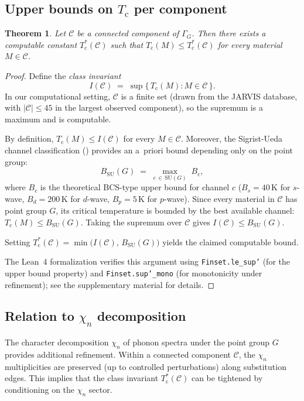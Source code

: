 \documentclass[12pt,a4paper]{article}
\theoremstyle{plain}
\newtheorem{theorem}{Theorem}[section]
\theoremstyle{definition}
\theoremstyle{remark}
\newcommand{\Tc}{T_{\mathrm{c}}}
\newcommand{\chin}{\chi_n}
\begin{document}
\subsection{Upper bounds on $\Tc$ per component}

\begin{theorem}\label{thm:upper-bound}
Let $\mathcal{C}$ be a connected component of $\Gamma_G$.  Then there
exists a computable constant $\Tc^*(\mathcal{C})$ such that
$\Tc(M) \leq \Tc^*(\mathcal{C})$ for every material $M \in \mathcal{C}$.
\end{theorem}

\begin{proof}
Define the \emph{class invariant}
\[
  I(\mathcal{C}) \;=\; \sup\bigl\{\,\Tc(M) : M \in \mathcal{C}\,\bigr\}.
\]
In our computational setting, $\mathcal{C}$ is a finite set (drawn from the
JARVIS database, with $|\mathcal{C}| \leq 45$ in the largest observed
component), so the supremum is a maximum and is computable.

By definition, $\Tc(M) \leq I(\mathcal{C})$ for every
$M \in \mathcal{C}$.  Moreover, the Sigrist-Ueda channel classification
() provides an a~priori bound depending only on the
point group:
\[
  B_{\mathrm{SU}}(G) \;=\; \max_{c\,\in\,\mathrm{SU}(G)}\; B_c,
\]
where $B_c$ is the theoretical BCS-type upper bound for channel $c$
($B_s = 40$\,K for $s$-wave, $B_d = 200$\,K for $d$-wave, $B_p = 5$\,K for
$p$-wave).  Since every material in $\mathcal{C}$ has point group $G$, its
critical temperature is bounded by the best available channel:
$\Tc(M) \leq B_{\mathrm{SU}}(G)$.  Taking the supremum over
$\mathcal{C}$ gives $I(\mathcal{C}) \leq B_{\mathrm{SU}}(G)$.

Setting $\Tc^*(\mathcal{C}) = \min\bigl(I(\mathcal{C}),\,
B_{\mathrm{SU}}(G)\bigr)$ yields the claimed computable bound.

The Lean~4 formalization verifies this argument using
\texttt{Finset.le\_sup'} (for the upper bound property) and
\texttt{Finset.sup'\_mono} (for monotonicity under refinement); see the
supplementary material for details.
\end{proof}

\subsection{Relation to $\chin$ decomposition}\label{subsec:chin-refinement}

The character decomposition $\chin$ of phonon spectra under the point group
$G$ provides additional refinement.  Within a connected component
$\mathcal{C}$, the $\chin$ multiplicities are preserved (up to controlled
perturbations) along substitution edges.  This implies that the class
invariant $\Tc^*(\mathcal{C})$ can be tightened by conditioning on the
$\chin$ sector.
\end{document}
